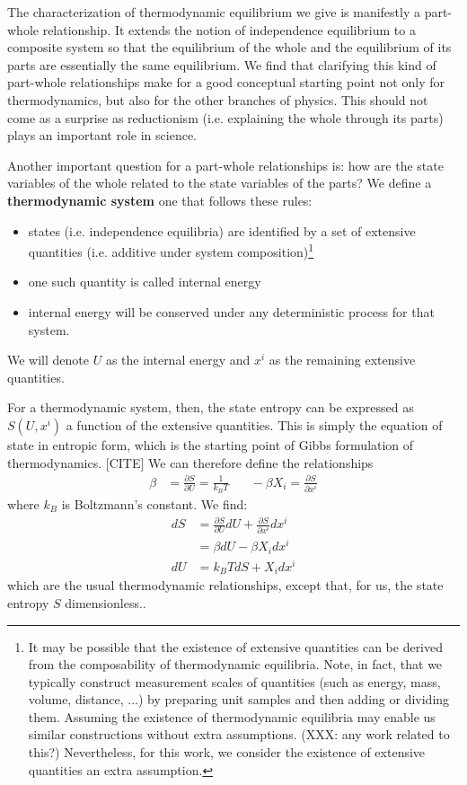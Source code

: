 \documentclass[letterpaper,twocolumn]{article}
\begin{document}
The characterization of thermodynamic equilibrium we give is manifestly a part-whole relationship. It extends the notion of independence equilibrium to a composite system so that the equilibrium of the whole and the equilibrium of its parts are essentially the same equilibrium. We find that clarifying this kind of part-whole relationships make for a good conceptual starting point not only for thermodynamics, but also for the other branches of physics. This should not come as a surprise as reductionism (i.e. explaining the whole through its parts) plays an important role in science.

Another important question for a part-whole relationships is: how are the state variables of the whole related to the state variables of the parts? We define a \textbf{thermodynamic system} one that follows these rules: 
\begin{itemize}
	\item states (i.e. independence equilibria) are identified by a set of extensive quantities (i.e. additive under system composition)\footnote{It may be possible that the existence of extensive quantities can be derived from the composability of thermodynamic equilibria. Note, in fact, that we typically construct measurement scales of quantities (such as energy, mass, volume, distance, ...) by preparing unit samples and then adding or dividing them. Assuming the existence of thermodynamic equilibria may enable us similar constructions without extra assumptions. (XXX: any work related to this?) Nevertheless, for this work, we consider the existence of extensive quantities an extra assumption.
	}
	\item one such quantity is called internal energy
	\item internal energy will be conserved under any deterministic process for that system.
\end{itemize}
We will denote $U$ as the internal energy and $x^i$ as the remaining extensive quantities.

For a thermodynamic system, then, the state entropy can be expressed as $S(U, x^i)$ a function of the extensive quantities. This is simply the equation of state in entropic form, which is the starting point of Gibbs formulation of thermodynamics. [CITE] We can therefore define the relationships
\begin{align}
	\beta &= \frac{\partial S}{\partial U} = \frac{1}{k_B T} \;\;\;\;\;\; - \beta X_i = \frac{\partial S}{\partial x^i}
\end{align}
where $k_B$ is Boltzmann's constant. We find:
\begin{align}
dS &= \frac{\partial S}{\partial U} dU + \frac{\partial S}{\partial x^i} dx^i \\
&= \beta dU - \beta X_i dx^i \\
dU &= k_B T dS + X_i dx^i
\end{align}
which are the usual thermodynamic relationships, except that, for us, the state entropy $S$ dimensionless..
\end{document}
